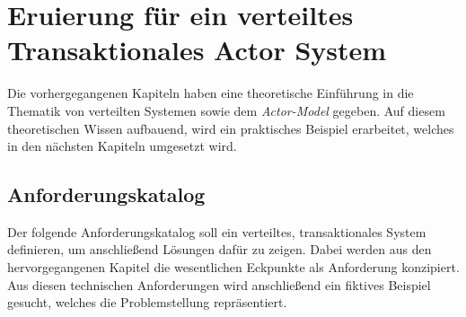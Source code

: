 \chapter{Eruierung für ein verteiltes Transaktionales Actor System} 
\label{cha:Eruierung}
Die vorhergegangenen Kapiteln haben eine theoretische Einführung in die Thematik von verteilten Systemen sowie dem \textit{Actor-Model}  gegeben. Auf diesem theoretischen Wissen aufbauend, wird ein praktisches Beispiel erarbeitet, welches in den nächsten Kapiteln umgesetzt wird. 

\section{Anforderungskatalog} \label{sec:Eruierung:technicalRequierements}
Der folgende Anforderungskatalog soll ein verteiltes, transaktionales System definieren, um anschließend Lösungen dafür zu zeigen. Dabei werden aus den hervorgegangenen Kapitel die  wesentlichen Eckpunkte als Anforderung konzipiert. Aus diesen technischen Anforderungen wird anschließend ein fiktives Beispiel gesucht, welches die Problemstellung  repräsentiert.

